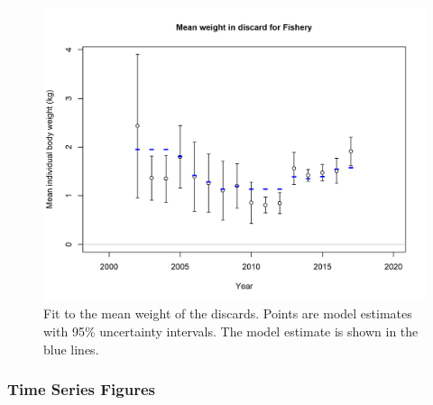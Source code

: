 \documentclass[12pt,]{article}
\begin{document}
\begin{figure}
\centering
\includegraphics{r4ss/plots_mod1/bodywt_fit_fltFishery.png}
\caption{Fit to the mean weight of the discards. Points are model
estimates with 95\% uncertainty intervals. The model estimate is shown
in the blue lines.\label{fig:bodywt_fit_fltFishery}}
\end{figure}

\FloatBarrier

\newpage

\hypertarget{time-series-figures}{%
\subsubsection{Time Series Figures}\label{time-series-figures}}

\FloatBarrier

\vspace{3cm}
\end{document}
